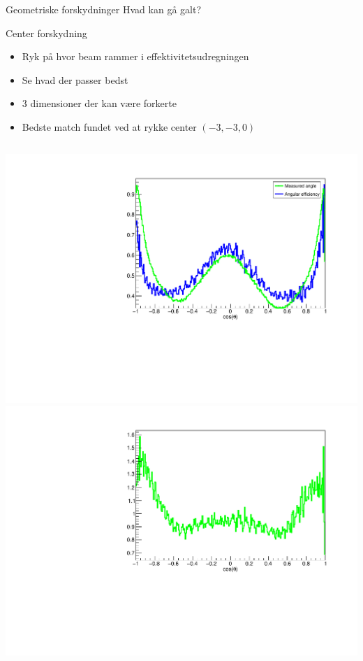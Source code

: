 \begin{frame}{Geometriske forskydninger}
	Hvad kan gå galt?
	\begin{itemize}
	\end{itemize}
\end{frame}

\begin{frame}{Center forskydning}
	\begin{itemize}
		\item Ryk på hvor beam rammer i effektivitetsudregningen
		\item Se hvad der passer bedst
		\item 3 dimensioner der kan være forkerte
		\item Bedste match fundet ved at rykke center $(-3, -3, 0)$
	\end{itemize}
\begin{columns}
	\includegraphics[width=\columnwidth]{../figures/betaAngles/centerCorrectedAndData.pdf}
	\includegraphics[width=\columnwidth]{../figures/betaAngles/dataDivEffCenterCorrected.pdf}

\end{columns}
\end{frame}
